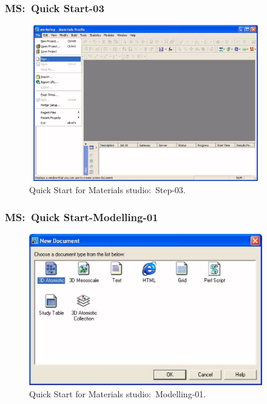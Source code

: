 \frame
{
	\frametitle{\textrm{MS:~Quick Start-03}}
\begin{figure}[h!]
\centering
\vspace*{-0.10in}
\includegraphics[height=2.68in,width=4.00in,viewport=0 0 1090 760,clip]{Figures/MS-New_Project-03.png}
\caption{\tiny \textrm{Quick Start for Materials studio:~Step-03.}}%
\label{MS-Quick_Start-03}
\end{figure}
}

\frame
{
	\frametitle{\textrm{MS:~Quick Start-Modelling-01}}
\begin{figure}[h!]
\centering
\vspace*{-0.10in}
\includegraphics[height=2.60in,width=4.00in,viewport=0 0 1090 710,clip]{Figures/MS-New_Project-04.png}
\caption{\tiny \textrm{Quick Start for Materials studio:~Modelling-01.}}%
\label{MS-Quick_Start-Modelling-01}
\end{figure}
}

